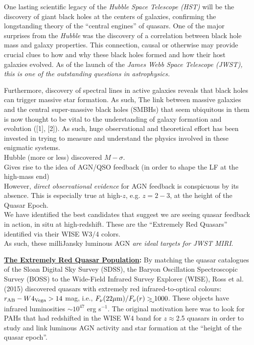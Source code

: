 

One lasting scientific legacy of the {\it Hubble Space Telescope
(HST)} will be the discovery of giant black holes at the centers of
galaxies, confirming the longstanding theory of the ``central
engines'' of quasars. One of the major surprises from the {\it Hubble}
was the discovery of a correlation between black hole mass and galaxy
properties.  This connection, causal or otherwise may provide crucial
clues to how and why these black holes formed and how their host
galaxies evolved. As of the launch of the {\it James Webb Space
Telescope (JWST), this is one of the outstanding questions in
astrophysics.}

Furthermore, discovery of spectral lines in active galaxies reveals that black holes can trigger massive star formation. 
As such, %
The link between massive galaxies and the central super-massive black holes (SMBHs) that seem ubiquitous in them is now thought to be vital to the understanding of galaxy formation and evolution ([1], [2]).  As such, huge observational and theoretical effort has been invested in trying to measure and understand the physics involved in these enigmatic systems.\\

\smallskip
\smallskip
\noindent
Hubble (more or less) discovered $M-\sigma$. \\
Gives rise to the idea of AGN/QSO feedback (in order to shape the LF at the high-mass end)\\
However, {\it direct observational evidence} for AGN feedback is conspicuous by its absence. This is especially true at high-$z$, e.g. $z=2-3$, at the height of the Quasar Epoch. \\
We have identified the best candidates that suggest we are seeing quasar feedback in action, in situ at high-redshift. These are the ``Extremely Red Quasars'' identified via their WISE W3/4 colors. \\
As such, these milliJansky luminous AGN {\it are ideal targets for JWST MIRI}. 




\medskip
\medskip

\smallskip
\smallskip
\noindent
{\bf \underline{The Extremely Red Quasar Population}:}
By matching the quasar catalogues of the Sloan Digital Sky Survey
(SDSS), the Baryon Oscillation Spectroscopic Survey (BOSS) to the
Wide-Field Infrared Survey Explorer (WISE), Ross et al. (2015)
discovered quasars with extremely red infrared-to-optical colours:
$r_{\rm AB}-W4_{\rm Vega}>14$ mag, i.e., $F_\nu({\rm 22\mu
m})/F_\nu(r) \gtrsim 1000$.  These objects have infrared luminosities
$\sim 10^{47}$ erg s$^{-1}$.  The original motivation here was to look
for PAHs that had redshifted in the WISE W4 band for $z\approx$2.5
quasars in order to study and link luminous AGN activity and star
formation at the ``height of the quasar epoch''.

